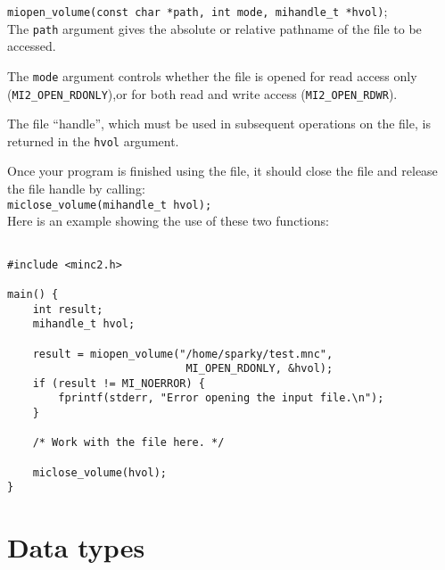 \documentclass{article}
\begin{document}
{\tt miopen\_volume(const char *path, int mode, mihandle\_t *hvol)}; \\

The {\tt path} argument gives the absolute or relative pathname of the
file to be accessed.

The {\tt mode} argument controls whether the file is opened for read
access only \\
({\tt MI2\_OPEN\_RDONLY}),or for both read and write access ({\tt MI2\_OPEN\_RDWR}). 

The file ``handle'', which must be used in subsequent operations on the
file, is returned in the {\tt hvol} argument.

Once your program is finished using the file, it should close the file
and release the file handle by calling:\\

{\tt miclose\_volume(mihandle\_t hvol);} \\

Here is an example showing the use of these two functions:

\begin{verbatim}

#include <minc2.h>

main() {
    int result;
    mihandle_t hvol;

    result = miopen_volume("/home/sparky/test.mnc", 
                            MI_OPEN_RDONLY, &hvol);
    if (result != MI_NOERROR) {
        fprintf(stderr, "Error opening the input file.\n");
    }

    /* Work with the file here. */

    miclose_volume(hvol);
}
\end{verbatim}

\newpage
\section{Data types}
\end{document}
